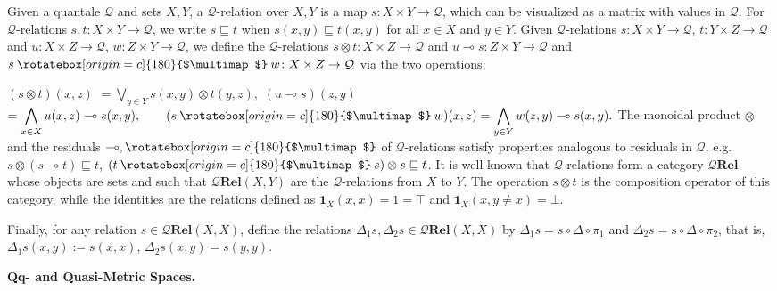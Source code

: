\documentclass[10pt,a4paper]{amsart}
\providecommand{\multimapinv}{\mathbin{\rotatebox[origin=c]{180}{$\multimap$}}}
\begin{document}
Given a quantale $\mathcal{Q}$ and sets $X,Y$, a $\mathcal{Q}$-relation over $X,Y$ is a map $s\colon X\times Y\to\mathcal{Q}$, which can be visualized as a matrix with values in $\mathcal{Q}$. For $\mathcal{Q}$-relations $s,t\colon X\times Y\to\mathcal{Q}$, we write $s\sqsubseteq t$ when $s(x,y)\sqsubseteq t(x,y)$ for all $x\in X$ and $y\in Y$. Given $\mathcal{Q}$-relations $s\colon X\times Y\to\mathcal{Q}$, $t\colon Y\times Z\to\mathcal{Q}$ and $u\colon X\times Z\to\mathcal{Q}$, $w\colon Z\times Y\to\mathcal{Q}$, we define the $\mathcal{Q}$-relations $s\otimes t\colon X\times Z\to\mathcal{Q}$ and $u\multimap s\colon Z\times Y\to\mathcal{Q}$ and $s\multimapinv w\colon X\times Z\to\mathcal{Q}$ via the two operations:\par
    $\displaystyle(s\otimes t)(x,z)$ $\displaystyle=\bigvee_{y\in Y}s(x,y)\otimes t(y,z),$     $\displaystyle(u\multimap s)(z,y)$ $\displaystyle=\bigwedge_{x\in X}u(x,z)\multimap s(x,y),\qquad(s\multimapinv w)%
(x,z)=\bigwedge_{y\in Y}w(z,y)\multimap s(x,y).$    
The monoidal product $\otimes$ and the residuals $\multimap,\multimapinv$ of $\mathcal{Q}$-relations satisfy properties analogous to residuals in $\mathcal{Q}$, e.g. $s\otimes(s\multimap t)\sqsubseteq t$, $(t\multimapinv s)\otimes s\sqsubseteq t$. It is well-known that $\mathcal{Q}$-relations form a category $\mathcal{Q}\textbf{Rel}$ whose objects are sets and such that $\mathcal{Q}\textbf{Rel}(X,Y)$ are the $\mathcal{Q}$-relations from $X$ to $Y$. The operation $s\otimes t$ is the composition operator of this category, while the identities are the relations defined as $\mathbf{1}_{X}(x,x)=1=\top$ and $\mathbf{1}_{X}(x,y\neq x)=\bot$.\par
 
 
 
Finally, for any relation $s\in\mathcal{Q}\mathbf{Rel}(X,X)$, define the relations $\Delta_{1}s,\Delta_{2}s\in\mathcal{Q}\mathbf{Rel}(X,X)$ by $\Delta_{1}s=s\circ\Delta\circ\pi_{1}$ and $\Delta_{2}s=s\circ\Delta\circ\pi_{2}$, that is, $\Delta_{1}s(x,y):=s(x,x)$, $\Delta_{2}s(x,y)=s(y,y)$.\par
 
 
 
 
\par\medskip\noindent\textbf{Qq- and Quasi-Metric Spaces.}\par
 
\end{document}
